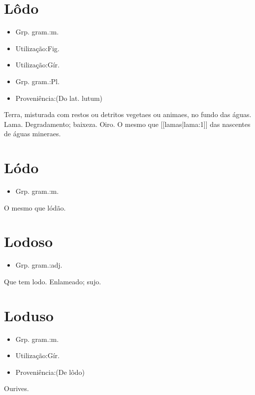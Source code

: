 \section{Lôdo}
\begin{itemize}
\item {Grp. gram.:m.}
\end{itemize}
\begin{itemize}
\item {Utilização:Fig.}
\end{itemize}
\begin{itemize}
\item {Utilização:Gír.}
\end{itemize}
\begin{itemize}
\item {Grp. gram.:Pl.}
\end{itemize}
\begin{itemize}
\item {Proveniência:(Do lat. \textunderscore lutum\textunderscore )}
\end{itemize}
Terra, misturada com restos ou detritos vegetaes ou animaes, no fundo das águas.
Lama.
Degradamento; baixeza.
Oiro.
O mesmo que [[lamas|lama:1]] das nascentes de águas mineraes.
\section{Lódo}
\begin{itemize}
\item {Grp. gram.:m.}
\end{itemize}
O mesmo que \textunderscore lódão\textunderscore .
\section{Lodoso}
\begin{itemize}
\item {Grp. gram.:adj.}
\end{itemize}
Que tem lodo.
Enlameado; sujo.
\section{Loduso}
\begin{itemize}
\item {Grp. gram.:m.}
\end{itemize}
\begin{itemize}
\item {Utilização:Gír.}
\end{itemize}
\begin{itemize}
\item {Proveniência:(De \textunderscore lôdo\textunderscore )}
\end{itemize}
Ourives.
